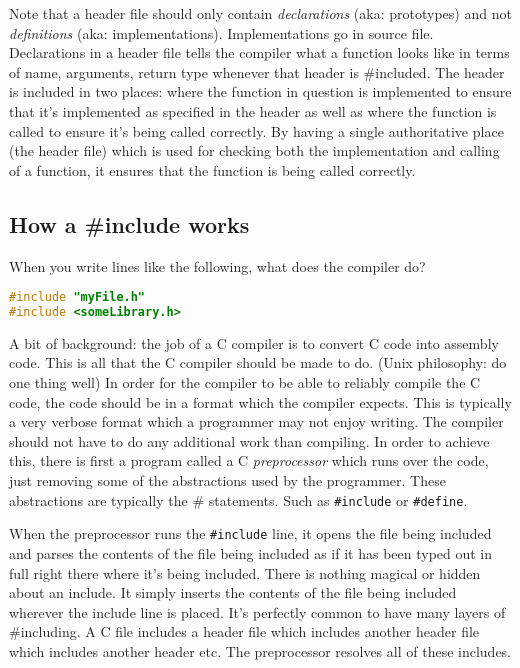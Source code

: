 Note that a header file should only contain \emph{declarations} (aka: prototypes) and not \emph{definitions} (aka: implementations). Implementations go in source file.
Declarations in a header file tells the compiler what a function looks like in terms of name, arguments, return type whenever that header is \#included. 
The header is included in two places: where the function in question is implemented to ensure that it's implemented as specified in the header as well as where the function is called to ensure it's being called correctly.
By having a single authoritative place (the header file) which is used for checking both the implementation and calling of a function, it ensures that the function is being called correctly.

\subsection{How a \#include works}
When you write lines like the following, what does the compiler do?
\begin{lstlisting}[language=C]
#include "myFile.h"
#include <someLibrary.h>
\end{lstlisting}

A bit of background: the job of a C compiler is to convert C code into assembly code. This is all that the C compiler should be made to do. (Unix philosophy: do one thing well)
In order for the compiler to be able to reliably compile the C code, the code should be in a format which the compiler expects. 
This is typically a very verbose format which a programmer may not enjoy writing.
The compiler should not have to do any additional work than compiling.
In order to achieve this, there is first a program called a C \emph{preprocessor} which runs over the code, just removing some of the abstractions used by the programmer. 
These abstractions are typically the \# statements. Such as \texttt{\#include} or \texttt{\#define}.

When the preprocessor runs the \texttt{\#include} line, it opens the file being included and parses the contents of the file being included as if it has been typed out in full right there where it's being included.
There is nothing magical or hidden about an include. It simply inserts the contents of the file being included wherever the include line is placed. It's perfectly common to have many layers of \#including. A C file includes a header file which includes another header file which includes another header etc. The preprocessor resolves all of these includes.\\

